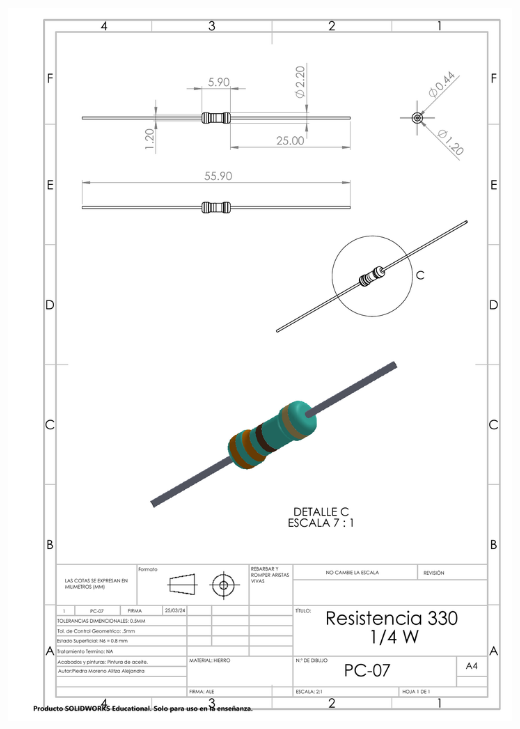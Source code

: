\begin{center}
\includegraphics[width=.85\textwidth]{22/img/resistenciaDibujo.PDF}~\\[15cm]
\end{center}

